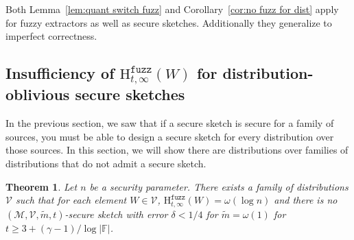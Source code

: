 \documentclass[11pt]{article}
\newcommand{\corref}[1]{\mbox{Corollary~\ref{#1}}}
\newcommand{\lemref}[1]{\mbox{Lemma~\ref{#1}}}
\newcommand{\Hfuzz}{\mathrm{H}^{\mathtt{fuzz}}_{t,\infty}}
\newtheorem{theorem}{Theorem}[section]
\begin{document}


Both \lemref{lem:quant switch fuzz} and \corref{cor:no fuzz for dist} apply for fuzzy extractors as well as secure sketches.  Additionally they generalize to imperfect correctness.

\subsection{Insufficiency of $\Hfuzz(W)$ for distribution-oblivious secure sketches}
In the previous section, we saw that if a secure sketch is secure for a family of sources, you must be able to design a secure sketch for every distribution over those sources.  In this section, we will show there are distributions over families of distributions that do not admit a secure sketch.

\begin{theorem}
\label{thm:imposs sketch}
Let $n$ be a security parameter.  There exists a family of distributions $\mathcal{V}$ such that for each element $W\in \mathcal{V}$, $\Hfuzz(W)= \omega(\log n)$ and there is no $(\mathcal{M}, \mathcal{V}, \tilde{m}, t)$-secure sketch with error $\delta < 1/4$ for $\tilde{m} =\omega(1)$ for $t\ge 3 + (\gamma-1) / \log |\mathbb{F}|$.  
\end{theorem}
\end{document}
